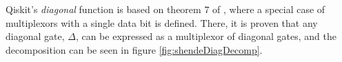 \documentclass[../../../dissertation.tex]{subfiles}
\begin{document}
Qiskit's \textit{diagonal} function is based on theorem $7$ of \cite{shende06},
where a special case of multiplexors with a single data bit is defined. There,
it is proven that any diagonal gate, $\Delta$, can be expressed as a
multiplexor of diagonal gates, and the decomposition can be seen in figure
\ref{fig:shendeDiagDecomp}. 
\end{document}
